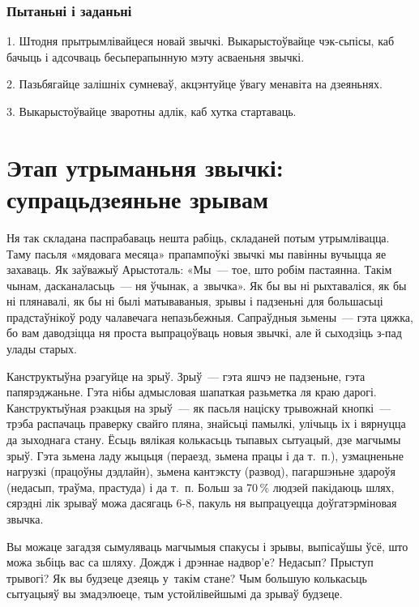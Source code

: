 \subsubsection{Пытаньні і заданьні}

1. Штодня прытрымлівайцеся новай звычкі. Выкарыстоўвайце чэк-сьпісы, каб бачыць і адсочваць бесьперапынную мэту асваеньня звычкі.

2. Пазьбягайце залішніх сумневаў, акцэнтуйце ўвагу менавіта на дзеяньнях.

3. Выкарыстоўвайце зваротны адлік, каб хутка стартаваць.


\section{Этап утрыманьня звычкі: супрацьдзеяньне зрывам}

Ня так складана паспрабаваць нешта рабіць, складаней потым утрымлівацца. Таму пасьля «мядовага месяца» прапампоўкі звычкі мы павінны вучыцца яе захаваць. Як заўважыў Арыстоталь: «Мы~--- тое, што робім пастаянна. Такім чынам, дасканаласьць~--- ня ўчынак, а~звычка». Як бы вы ні рыхтаваліся, як бы ні плянавалі, як бы ні былі матываваныя, зрывы і падзеньні для большасьці прадстаўнікоў роду чалавечага непазьбежныя. Сапраўдныя зьмены~--- гэта цяжка, бо вам даводзіцца ня проста выпрацоўваць новыя звычкі, але й сыходзіць з-пад улады старых.

Канструктыўна рэагуйце на зрыў. Зрыў~--- гэта яшчэ не падзеньне, гэта папярэджаньне. Гэта нібы адмысловая шапаткая разьметка ля краю дарогі. Канструктыўная рэакцыя на зрыў~--- як пасьля націску трывожнай кнопкі~--- трэба распачаць праверку свайго пляна, знайсьці памылкі, улічыць іх і вярнуцца да зыходнага стану. Ёсьць вялікая колькасьць тыпавых сытуацый, дзе магчымы зрыў. Гэта зьмена ладу жыцьця (пераезд, зьмена працы і да т.~п.), узмацненьне нагрузкі (працоўны дэдлайн), зьмена кантэксту (развод), пагаршэньне здароўя (недасып, траўма, прастуда) і да т.~п. Больш за 70\,\% людзей пакідаюць шлях, сярэдні лік зрываў можа дасягаць 6-8, пакуль ня выпрацуецца доўгатэрміновая звычка.

Вы можаце загадзя сымуляваць магчымыя спакусы і зрывы, выпісаўшы ўсё, што можа зьбіць вас са шляху. Дождж і дрэннае надвор'е? Недасып? Прыступ трывогі? Як вы будзеце дзеяць у~такім стане? Чым большую колькасьць сытуацыяў вы змадэлюеце, тым устойлівейшымі да зрываў будзеце.

